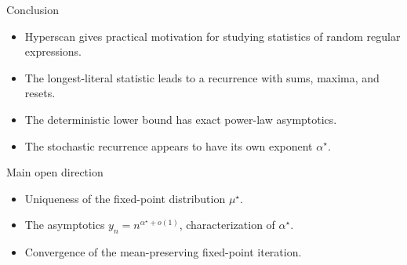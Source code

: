 \begin{frame}{Conclusion}
  \begin{itemize}
    \item Hyperscan gives practical motivation for studying statistics of random regular expressions.
    \item The longest-literal statistic leads to a recurrence with sums, maxima, and resets.
    \item The deterministic lower bound has exact power-law asymptotics.
    \item The stochastic recurrence appears to have its own exponent $\alpha^\star$.
  \end{itemize}

  \vspace{0.35cm}
  \begin{block}{Main open direction}
    \begin{itemize}
      \item Uniqueness of the fixed-point distribution $\mu^\star$.
      \item The asymptotics $y_n=n^{\alpha^\star+o(1)}$, characterization of $\alpha^\star$.
      \item Convergence of the mean-preserving fixed-point iteration.
    \end{itemize}
  \end{block}
\end{frame}
